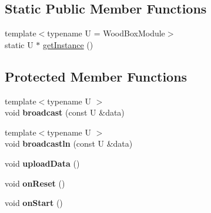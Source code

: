 \subsection*{Static Public Member Functions}
\begin{DoxyCompactItemize}
\item 
{\footnotesize template$<$typename U  = Wood\+Box\+Module$>$ }\\static U $\ast$ \mbox{\hyperlink{classwood_box_1_1module_1_1_wood_box_module_a3f13bd3a6318ddf2a7db84f86b198a49}{get\+Instance}} ()
\end{DoxyCompactItemize}
\subsection*{Protected Member Functions}
\begin{DoxyCompactItemize}
\item 
\mbox{\label{classwood_box_1_1module_1_1_wood_box_module_ac481cbb3ee83f192218a5943c59d74fe}} 
{\footnotesize template$<$typename U $>$ }\\void {\bfseries broadcast} (const U \&data)
\item 
\mbox{\label{classwood_box_1_1module_1_1_wood_box_module_a5329c737b0a102851782b5d2a6019bc8}} 
{\footnotesize template$<$typename U $>$ }\\void {\bfseries broadcastln} (const U \&data)
\item 
\mbox{\label{classwood_box_1_1module_1_1_wood_box_module_a4fa136e3e3f29c71d12a8163b4c5a765}} 
void {\bfseries upload\+Data} ()
\item 
\mbox{\label{classwood_box_1_1module_1_1_wood_box_module_a5e6a48a192f53fa5d739ec40153e3af4}} 
void {\bfseries on\+Reset} ()
\item 
\mbox{\label{classwood_box_1_1module_1_1_wood_box_module_a96620d9bbbb5ad60347aac340dee6892}} 
void {\bfseries on\+Start} ()
\item 
\mbox{\label{classwood_box_1_1module_1_1_wood_box_module_a5897df7845ffc3b9d0ec8394e10a2ff2}} 

\end{DoxyCompactItemize}
